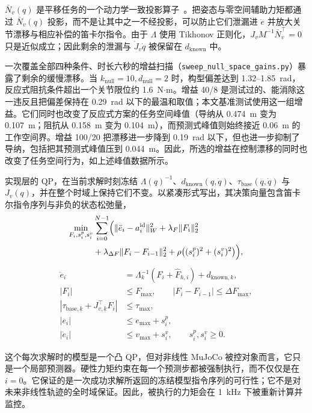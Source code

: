\documentclass[journal]{IEEEtran}
\begin{document}
$\bar N_v(q)$ 是平移任务的一个动力学一致投影算子~\cite{ref9}。把姿态与零空间辅助力矩都通过 $\bar N_v(q)$ 投影，而不是让其中之一不经投影，可以防止它们泄漏进 $\ddot e$ 并放大关节漂移与相应补偿的笛卡尔指令。由于 $\Lambda$ 使用 Tikhonov 正则化，$J_vM^{-1}\bar N_v^\top=0$ 只是近似成立；因此剩余的泄漏与 $\dot J_v\dot q$ 被保留在 $d_{\mathrm{known}}$ 中。

一次覆盖全部四种条件、时长六秒的增益扫描（\texttt{sweep\_null\_space\_gains.py}）暴露了剩余的缓慢漂移。当 $k_{\mathrm{null}}=10,d_{\mathrm{null}}=2$ 时，构型偏差达到 1.32--1.85~rad，反应式阻抗条件超出一个关节限位约 1.6~N$\cdot$m。增益 40/8 是测试过的、能消除这一违反且把偏差保持在 0.29~rad 以下的最温和取值；本文基准测试使用这一组增益。它们同时也改变了反应式方案的任务空间峰值（导纳从 0.474~m 变为 0.107~m；阻抗从 0.158~m 变为 0.104~m），而预测式峰值则始终接近 0.06~m 的工作空间界。增益 100/20 把漂移进一步降到 0.19~rad 以下，但也进一步抑制了导纳，包括把其预测式峰值压到 0.044~m。因此，所选的增益在控制漂移的同时也改变了任务空间行为，如上述峰值数据所示。

实现层的 QP，在当前求解时刻冻结 $\Lambda(q)^{-1}$、$d_{\mathrm{known}}(q,\dot q)$、$\tau_{\mathrm{base}}(q,\dot q)$ 与 $J_v(q)$，并在整个时域上保持它们不变。以紧凑形式写出，其决策向量包含笛卡尔指令序列与非负的状态松弛量，
\begin{equation}
\begin{aligned}
\min_{F_i,s^p_i,s^v_i} & \sum_{i=0}^{N-1} \Bigl(
\|\ddot e_i-a_i^{\mathrm{id}}\|_W^2+\lambda_F\|F_i\|_2^2\\
&+\lambda_{\Delta F}\|F_i-F_{i-1}\|_2^2
+\rho\bigl((s^p_i)^2+(s^v_i)^2\bigr) \Bigr),
\end{aligned}
\end{equation}
\begin{equation}
\begin{aligned}
\ddot e_i&=\Lambda_k^{-1}(F_i+\hat F_{h,i})+d_{\mathrm{known},k},\\
|F_i|&\le F_{\max},\qquad |F_i-F_{i-1}|\le\Delta F_{\max},\\
|\tau_{\mathrm{base},k}+J_{v,k}^{\top}F_i|&\le\tau_{\max},\\
|e_i|&\le e_{\max}+s^p_i,\\
|\dot e_i|&\le v_{\max}+s^v_i,\qquad s^p_i,s^v_i\ge0.
\end{aligned}
\end{equation}

这个每次求解时的模型是一个凸 QP，但对非线性 MuJoCo 被控对象而言，它只是一个局部预测器。硬性力矩约束在每一个预测步都被强制执行，而不仅仅是在 $i=0$。它保证的是一次成功求解所返回的冻结模型指令序列的可行性；它不是对未来非线性轨迹的全时域保证。因此，被执行的力矩会在 1~kHz 下被重新计算并监控。
\end{document}
